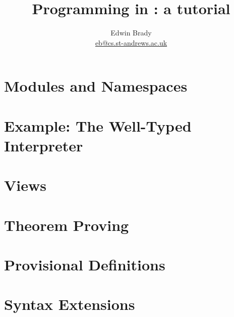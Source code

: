 \documentclass{article}
\title{Programming in \Idris{}: a tutorial}
\author{Edwin Brady \\ \url{eb@cs.st-andrews.ac.uk}}
\begin{document}
\maketitle








\section{Modules and Namespaces}
\section{Example: The Well-Typed Interpreter}
\section{Views}
\section{Theorem Proving}
\section{Provisional Definitions}
\section{Syntax Extensions}





\end{document}
